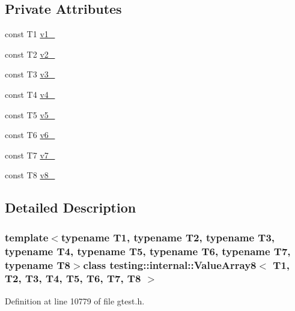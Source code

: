 \subsection*{\-Private \-Attributes}
\begin{DoxyCompactItemize}
\item 
const \-T1 \hyperlink{classtesting_1_1internal_1_1ValueArray8_aac1d0654cc6c1aceb4a5d0fa7a98042e}{v1\-\_\-}
\item 
const \-T2 \hyperlink{classtesting_1_1internal_1_1ValueArray8_a9f0a8ce6ce2fd27e980c4c51a7a7256a}{v2\-\_\-}
\item 
const \-T3 \hyperlink{classtesting_1_1internal_1_1ValueArray8_a4f8257321a2eab0456239174d6712d5e}{v3\-\_\-}
\item 
const \-T4 \hyperlink{classtesting_1_1internal_1_1ValueArray8_aac184059fee257381ccae81d8d112f85}{v4\-\_\-}
\item 
const \-T5 \hyperlink{classtesting_1_1internal_1_1ValueArray8_a1f3e0ada8419ed2e17cc61e6c0c54404}{v5\-\_\-}
\item 
const \-T6 \hyperlink{classtesting_1_1internal_1_1ValueArray8_a13d84d5824617bbc6fb1a6b3ee3cb745}{v6\-\_\-}
\item 
const \-T7 \hyperlink{classtesting_1_1internal_1_1ValueArray8_a4063f0b7a528133d018ee488ba44a9a3}{v7\-\_\-}
\item 
const \-T8 \hyperlink{classtesting_1_1internal_1_1ValueArray8_a596bc5260b2474271d1f6910ff6f665d}{v8\-\_\-}
\end{DoxyCompactItemize}


\subsection{\-Detailed \-Description}
\subsubsection*{template$<$typename \-T1, typename \-T2, typename \-T3, typename \-T4, typename \-T5, typename \-T6, typename \-T7, typename \-T8$>$class testing\-::internal\-::\-Value\-Array8$<$ T1, T2, T3, T4, T5, T6, T7, T8 $>$}



\-Definition at line 10779 of file gtest.\-h.



